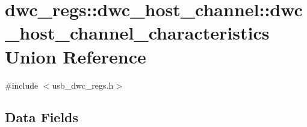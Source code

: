 \hypertarget{uniondwc__regs_1_1dwc__host__channel_1_1dwc__host__channel__characteristics}{\section{dwc\-\_\-regs\-:\-:dwc\-\_\-host\-\_\-channel\-:\-:dwc\-\_\-host\-\_\-channel\-\_\-characteristics Union Reference}
\label{uniondwc__regs_1_1dwc__host__channel_1_1dwc__host__channel__characteristics}
}


{\ttfamily \#include $<$usb\-\_\-dwc\-\_\-regs.\-h$>$}

\subsection*{Data Fields}
